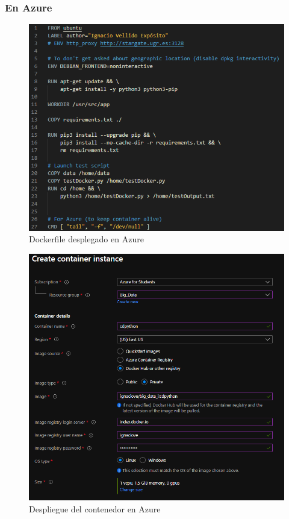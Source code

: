 \subsubsection{En Azure}

\begin{figure}[H]\center\includegraphics[width=.95\linewidth]{img/python/p10.png}\caption{Dockerfile desplegado en Azure}\end{figure}

\begin{figure}[H]\center\includegraphics[width=.95\linewidth]{img/python/p7.png}\caption{Despliegue del contenedor en Azure}\end{figure}

